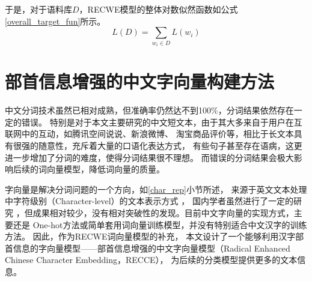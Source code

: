 \documentclass{standalone}
\begin{document}
于是，对于语料库$D$，RECWE模型的整体对数似然函数如公式\ref{overall_target_fun}所示。
\begin{equation}
    L\left ( D \right )=\sum_{w_i \in D}L\left ( w_i \right )
    \label{overall_target_fun}
\end{equation}





\section{部首信息增强的中文字向量构建方法}
中文分词技术虽然已相对成熟，但准确率仍然达不到100\%，分词结果依然存在一定的错误。
特别是对于本文主要研究的中文短文本，由于其大多来自于用户在互联网中的互动，如腾讯空间说说、新浪微博、
淘宝商品评价等，相比于长文本具有很强的随意性，充斥着大量的口语化表达方式，
有些句子甚至存在语病，这更进一步增加了分词的难度，使得分词结果很不理想。
而错误的分词结果会极大影响后续的词向量模型，降低词向量的质量。

字向量是解决分词问题的一个方向，如\ref{char_rep}小节所述，
来源于英文文本处理中字符级别（Character-level）的文本表示方式
，
国内学者虽然进行了一定的研究
，但成果相对较少，没有相对突破性的发现。目前中文字向量的实现方式，主要还是
One-hot方法或简单套用词向量训练模型，并没有特别适合中文汉字的训练方法。
因此，作为RECWE词向量模型的补充，
本文设计了一个能够利用汉字部首信息的字向量模型——部首信息增强的中文字向量模型（Radical Enhanced Chinese Character Embedding，RECCE），
为后续的分类模型提供更多的文本信息。
\end{document}
